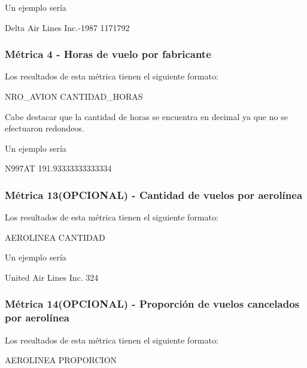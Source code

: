 \documentclass[a4paper,10pt]{article}
\begin{document}
            Un ejemplo sería\\
            \begin{center}
               Delta Air Lines Inc.-1987   1171792\\
            \end{center}

        \subsubsection{Métrica 4 - Horas de vuelo por fabricante}
            Los resultados de esta métrica tienen el siguiente formato:\\
            \begin{center}
                NRO\_AVION CANTIDAD\_HORAS
            \end{center}
            Cabe destacar que la cantidad de horas se encuentra en decimal ya que no se efectuaron redondeos.

            Un ejemplo sería\\
            \begin{center}
                N997AT  191.93333333333334\\
            \end{center}

        \subsubsection{Métrica 13(OPCIONAL) - Cantidad de vuelos por aerolínea}
            Los resultados de esta métrica tienen el siguiente formato:\\
            \begin{center}
                AEROLINEA CANTIDAD\\
            \end{center}

            Un ejemplo sería\\
            \begin{center}
               United Air Lines Inc.   324\\
            \end{center}

         \subsubsection{Métrica 14(OPCIONAL) - Proporción de vuelos cancelados por aerolínea}
            Los resultados de esta métrica tienen el siguiente formato:\\
            \begin{center}
                AEROLINEA PROPORCION\\
            \end{center}
\end{document}

